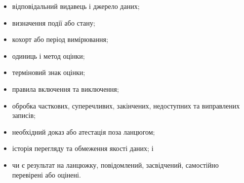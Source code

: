 \documentclass[11pt]{article}
\begin{document}
\begin{itemize}[leftmargin=*]
\item відповідальний видавець і джерело даних;
\item визначення події або стану;
\item кохорт або період вимірювання;
\item одиниць і метод оцінки;
\item терміновий знак оцінки;
\item правила включення та виключення;
\item обробка часткових, суперечливих, закінчених, недоступних та виправлених записів;
\item необхідний доказ або атестація поза ланцюгом;
\item історія перегляду та обмеження якості даних; і
\item чи є результат на ланцюжку, повідомлений, засвідчений, самостійно перевірені або оцінені.
\end{itemize}
\end{document}
